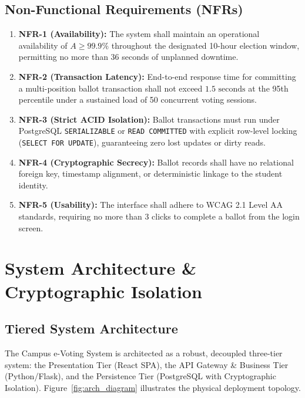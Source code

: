 \documentclass[12pt,a4paper,oneside]{report}
\begin{document}
\section{Non-Functional Requirements (NFRs)}
\begin{enumerate}
    \item \textbf{NFR-1 (Availability):} The system shall maintain an operational availability of $A \ge 99.9\%$ throughout the designated 10-hour election window, permitting no more than 36 seconds of unplanned downtime.
    \item \textbf{NFR-2 (Transaction Latency):} End-to-end response time for committing a multi-position ballot transaction shall not exceed $1.5\text{ seconds}$ at the 95th percentile under a sustained load of 50 concurrent voting sessions.
    \item \textbf{NFR-3 (Strict ACID Isolation):} Ballot transactions must run under PostgreSQL \texttt{SERIALIZABLE} or \texttt{READ COMMITTED} with explicit row-level locking (\texttt{SELECT FOR UPDATE}), guaranteeing zero lost updates or dirty reads.
    \item \textbf{NFR-4 (Cryptographic Secrecy):} Ballot records shall have no relational foreign key, timestamp alignment, or deterministic linkage to the student identity.
    \item \textbf{NFR-5 (Usability):} The interface shall adhere to WCAG 2.1 Level AA standards, requiring no more than 3 clicks to complete a ballot from the login screen.
\end{enumerate}

\chapter{System Architecture \& Cryptographic Isolation}
\label{chap:architecture}

\section{Tiered System Architecture}
The Campus e-Voting System is architected as a robust, decoupled three-tier system: the Presentation Tier (React SPA), the API Gateway \& Business Tier (Python/Flask), and the Persistence Tier (PostgreSQL with Cryptographic Isolation). Figure~\ref{fig:arch_diagram} illustrates the physical deployment topology.
\end{document}
